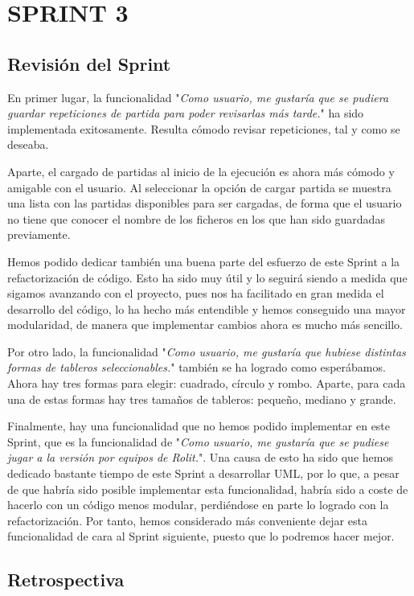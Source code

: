\documentclass[../../FINAL/Scrum/SCRUM.tex]{subfiles}
\begin{document}
\section{SPRINT 3}
\subsection{Revisión del Sprint}
En primer lugar, la funcionalidad "\textit{Como usuario, me gustaría que se pudiera guardar repeticiones de partida para poder revisarlas más tarde.}" ha sido implementada exitosamente. Resulta cómodo revisar repeticiones, tal y como se deseaba.

Aparte, el cargado de partidas al inicio de la ejecución es ahora más cómodo y amigable con el usuario. Al seleccionar la opción de cargar partida se muestra una lista con las partidas disponibles para ser cargadas, de forma que el usuario no tiene que conocer el nombre de los ficheros en los que han sido guardadas previamente.

Hemos podido dedicar también una buena parte del esfuerzo de este Sprint a la refactorización de código. Esto ha sido muy útil y lo seguirá siendo a medida que sigamos avanzando con el proyecto, pues nos ha facilitado en gran medida el desarrollo del código, lo ha hecho más entendible y hemos conseguido una mayor modularidad, de manera que implementar cambios ahora es mucho más sencillo.

Por otro lado, la funcionalidad "\textit{Como usuario, me gustaría que hubiese distintas formas de tableros seleccionables.}" también se ha logrado como esperábamos. Ahora hay tres formas para elegir: cuadrado, círculo y rombo. Aparte, para cada una de estas formas hay tres tamaños de tableros: pequeño, mediano y grande.

Finalmente, hay una funcionalidad que no hemos podido implementar en este Sprint, que es la funcionalidad de "\textit{Como usuario, me  gustaría que se pudiese jugar a la versión por equipos de Rolit.}". Una causa de esto ha sido que hemos dedicado bastante tiempo de este Sprint a desarrollar UML, por lo que, a pesar de que habría sido posible implementar esta funcionalidad, habría sido a coste de hacerlo con un código menos modular, perdiéndose en parte lo logrado con la refactorización. Por tanto, hemos considerado más conveniente dejar esta funcionalidad de cara al Sprint siguiente, puesto que lo podremos hacer mejor.

\subsection{Retrospectiva}
\end{document}
